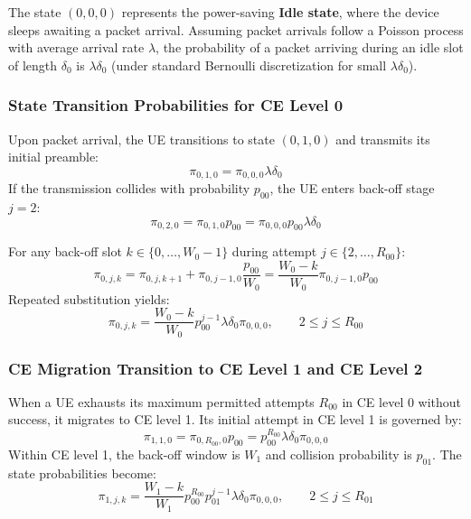 The state $(0, 0, 0)$ represents the power-saving \textbf{Idle state}, where the device sleeps awaiting a packet arrival. Assuming packet arrivals follow a Poisson process with average arrival rate $\lambda$, the probability of a packet arriving during an idle slot of length $\delta_0$ is $\lambda \delta_0$ (under standard Bernoulli discretization for small $\lambda \delta_0$).

\subsubsection{State Transition Probabilities for CE Level 0}
Upon packet arrival, the UE transitions to state $(0, 1, 0)$ and transmits its initial preamble:
\begin{equation}
    \pi_{0,1,0} = \pi_{0,0,0} \lambda \delta_0
\end{equation}
If the transmission collides with probability $p_{00}$, the UE enters back-off stage $j = 2$:
\begin{equation}
    \pi_{0,2,0} = \pi_{0,1,0} p_{00} = \pi_{0,0,0} p_{00} \lambda \delta_0
\end{equation}

For any back-off slot $k \in \{0, \dots, W_0 - 1\}$ during attempt $j \in \{2, \dots, R_{00}\}$:
\begin{equation}
    \pi_{0,j,k} = \pi_{0,j,k+1} + \pi_{0,j-1,0} \frac{p_{00}}{W_0} = \frac{W_0 - k}{W_0} \pi_{0,j-1,0} p_{00}
\end{equation}
Repeated substitution yields:
\begin{equation}
    \pi_{0,j,k} = \frac{W_0 - k}{W_0} p_{00}^{j-1} \lambda \delta_0 \pi_{0,0,0}, \qquad 2 \le j \le R_{00}
\end{equation}

\subsubsection{CE Migration Transition to CE Level 1 and CE Level 2}
When a UE exhausts its maximum permitted attempts $R_{00}$ in CE level 0 without success, it migrates to CE level 1. Its initial attempt in CE level 1 is governed by:
\begin{equation}
    \pi_{1,1,0} = \pi_{0, R_{00}, 0} p_{00} = p_{00}^{R_{00}} \lambda \delta_0 \pi_{0,0,0}
\end{equation}
Within CE level 1, the back-off window is $W_1$ and collision probability is $p_{01}$. The state probabilities become:
\begin{equation}
    \pi_{1,j,k} = \frac{W_1 - k}{W_1} p_{00}^{R_{00}} p_{01}^{j-1} \lambda \delta_0 \pi_{0,0,0}, \qquad 2 \le j \le R_{01}
\end{equation}

